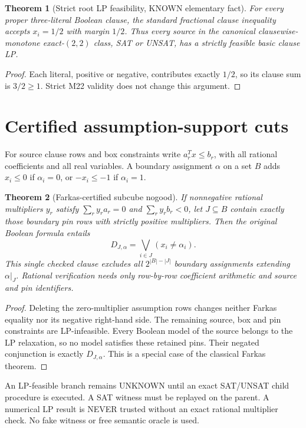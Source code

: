 \documentclass[11pt]{article}
\newtheorem{theorem}{Theorem}
\begin{document}
\begin{theorem}[Strict root LP feasibility, KNOWN elementary fact]
For every proper three-literal Boolean clause, the standard fractional clause inequality accepts $x_i=1/2$ with margin $1/2$. Thus every source in the canonical clausewise-monotone exact-$(2,2)$ class, SAT or UNSAT, has a strictly feasible basic clause LP.
\end{theorem}
\begin{proof}
Each literal, positive or negative, contributes exactly $1/2$, so its clause sum is $3/2\ge1$. Strict M22 validity does not change this argument.
\end{proof}

\section{Certified assumption-support cuts}
For source clause rows and box constraints write $a_r^Tx\le b_r$, with all rational coefficients and all real variables. A boundary assignment $\alpha$ on a set $B$ adds $x_i\le0$ if $\alpha_i=0$, or $-x_i\le-1$ if $\alpha_i=1$.
\begin{theorem}[Farkas-certified subcube nogood]
If nonnegative rational multipliers $y_r$ satisfy $\sum_ry_ra_r=0$ and $\sum_ry_rb_r<0$, let $J\subseteq B$ contain exactly those boundary pin rows with strictly positive multipliers. Then the original Boolean formula entails
\[
D_{J,\alpha}=\bigvee_{i\in J}(x_i\ne\alpha_i).
\]
This single checked clause excludes all $2^{|B|-|J|}$ boundary assignments extending $\alpha|_J$. Rational verification needs only row-by-row coefficient arithmetic and source and pin identifiers.
\end{theorem}
\begin{proof}
Deleting the zero-multiplier assumption rows changes neither Farkas equality nor its negative right-hand side. The remaining source, box and pin constraints are LP-infeasible. Every Boolean model of the source belongs to the LP relaxation, so no model satisfies these retained pins. Their negated conjunction is exactly $D_{J,\alpha}$. This is a special case of the classical Farkas theorem.
\end{proof}
An LP-feasible branch remains UNKNOWN until an exact SAT/UNSAT child procedure is executed. A SAT witness must be replayed on the parent. A numerical LP result is NEVER trusted without an exact rational multiplier check. No fake witness or free semantic oracle is used.
\end{document}
